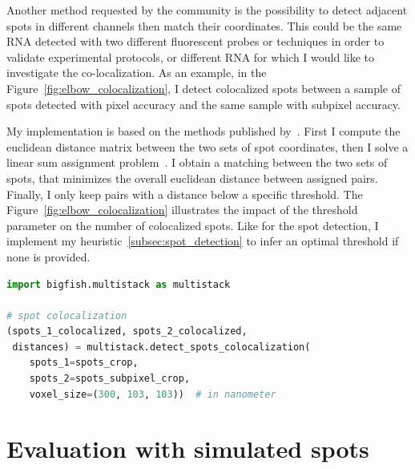 Another method requested by the community is the possibility to detect adjacent spots in different channels then match their coordinates.
This could be the same \ac{RNA} detected with two different fluorescent probes or techniques in order to validate experimental protocols, or different \ac{RNA} for which I would like to investigate the co-localization.
As an example, in the Figure~\ref{fig:elbow_colocalization}, I detect colocalized spots between a sample of spots detected with pixel accuracy and the same sample with subpixel accuracy.

My implementation is based on the methods published by~\cite{CORNES_2022}.
First I compute the euclidean distance matrix between the two sets of spot coordinates, then I solve a linear sum assignment problem~\cite{crouse_linear_assignment_2016, 2020SciPy}.
I obtain a matching between the two sets of spots, that minimizes the overall euclidean distance between assigned pairs.
Finally, I only keep pairs with a distance below a specific threshold.
The Figure~\ref{fig:elbow_colocalization} illustrates the impact of the threshold parameter on the number of colocalized spots.
Like for the spot detection, I implement my heuristic~\ref{subsec:spot_detection} to infer an optimal threshold if none is provided.\\

\begin{minipage}{0.9\textwidth}
\begin{lstlisting}[language=Python]
import bigfish.multistack as multistack

# spot colocalization
(spots_1_colocalized, spots_2_colocalized,
 distances) = multistack.detect_spots_colocalization(
	spots_1=spots_crop,
	spots_2=spots_subpixel_crop,
	voxel_size=(300, 103, 103))  # in nanometer
\end{lstlisting}
\end{minipage}


\section{Evaluation with simulated spots}
\label{sec:detection_evaluation}

